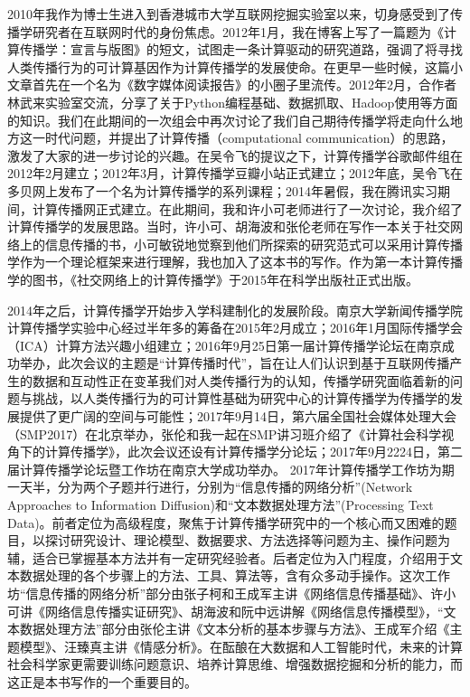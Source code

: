 \documentclass[letterpaper,10pt,english]{sphinxmanual}
\begin{document}
2010年我作为博士生进入到香港城市大学互联网挖掘实验室以来，切身感受到了传播学研究者在互联网时代的身份焦虑。2012年1月，我在博客上写了一篇题为《计算传播学：宣言与版图》的短文，试图走一条计算驱动的研究道路，强调了将寻找人类传播行为的可计算基因作为计算传播学的发展使命。在更早一些时候，这篇小文章首先在一个名为《数字媒体阅读报告》的小圈子里流传。2012年2月，合作者林武来实验室交流，分享了关于Python编程基础、数据抓取、Hadoop使用等方面的知识。我们在此期间的一次组会中再次讨论了我们自己期待传播学将走向什么地方这一时代问题，并提出了计算传播（computational communication）的思路，激发了大家的进一步讨论的兴趣。在吴令飞的提议之下，计算传播学谷歌邮件组在2012年2月建立；2012年3月，计算传播学豆瓣小站正式建立；2012年底，吴令飞在多贝网上发布了一个名为计算传播学的系列课程；2014年暑假，我在腾讯实习期间，计算传播网正式建立。在此期间，我和许小可老师进行了一次讨论，我介绍了计算传播学的发展思路。当时，许小可、胡海波和张伦老师在写作一本关于社交网络上的信息传播的书，小可敏锐地觉察到他们所探索的研究范式可以采用计算传播学作为一个理论框架来进行理解，我也加入了这本书的写作。作为第一本计算传播学的图书，《社交网络上的计算传播学》于2015年在科学出版社正式出版。

2014年之后，计算传播学开始步入学科建制化的发展阶段。南京大学新闻传播学院计算传播学实验中心经过半年多的筹备在2015年2月成立；2016年1月国际传播学会（ICA）计算方法兴趣小组建立；2016年9月25日第一届计算传播学论坛在南京成功举办，此次会议的主题是“计算传播时代”，旨在让人们认识到基于互联网传播产生的数据和互动性正在变革我们对人类传播行为的认知，传播学研究面临着新的问题与挑战，以人类传播行为的可计算性基础为研究中心的计算传播学为传播学的发展提供了更广阔的空间与可能性；2017年9月14日，第六届全国社会媒体处理大会（SMP2017）在北京举办，张伦和我一起在SMP讲习班介绍了《计算社会科学视角下的计算传播学》，此次会议还设有计算传播学分论坛；2017年9月22\sphinxhyphen{}24日，第二届计算传播学论坛暨工作坊在南京大学成功举办。
2017年计算传播学工作坊为期一天半，分为两个子题并行进行，分别为“信息传播的网络分析”(Network Approaches to Information Diffusion)和“文本数据处理方法”(Processing Text Data)。前者定位为高级程度，聚焦于计算传播学研究中的一个核心而又困难的题目，以探讨研究设计、理论模型、数据要求、方法选择等问题为主、操作问题为辅，适合已掌握基本方法并有一定研究经验者。后者定位为入门程度，介绍用于文本数据处理的各个步骤上的方法、工具、算法等，含有众多动手操作。这次工作坊“信息传播的网络分析”部分由张子柯和王成军主讲《网络信息传播基础》、许小可讲《网络信息传播实证研究》、胡海波和阮中远讲解《网络信息传播模型》，“文本数据处理方法”部分由张伦主讲《文本分析的基本步骤与方法》、王成军介绍《主题模型》、汪臻真主讲《情感分析》。在酝酿在大数据和人工智能时代，未来的计算社会科学家更需要训练问题意识、培养计算思维、增强数据挖掘和分析的能力，而这正是本书写作的一个重要目的。
\end{document}

